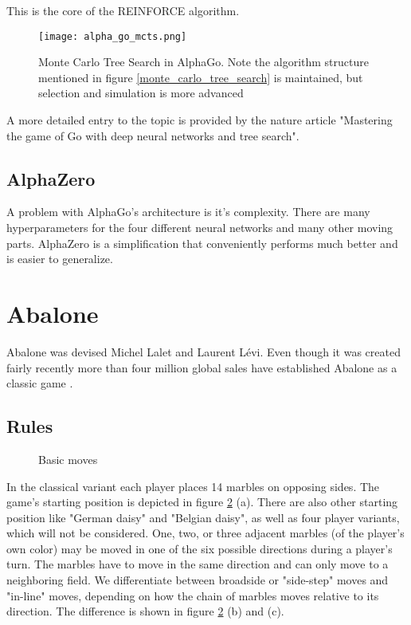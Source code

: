 This is the core of the REINFORCE algorithm. \cite{williams_simple_nodate}
\begin{figure}
    \centering
    \texttt{[image: alpha\_go\_mcts.png]}
    \caption{Monte Carlo Tree Search in AlphaGo. \cite{silver_mastering_2016} Note the algorithm structure mentioned in figure \ref{monte_carlo_tree_search} is maintained, but selection and simulation is more advanced}
    \label{alpha_go_mcts}
\end{figure}

A more detailed entry to the topic is provided by the nature article "Mastering the game of Go with deep neural networks and tree search". \cite{silver_mastering_2016}

\subsection{AlphaZero}
A problem with AlphaGo's architecture is it's complexity. There are many hyperparameters for the four different neural networks and many other moving parts. AlphaZero is a simplification that conveniently performs much better and is easier to generalize.

\section{Abalone}
Abalone was devised Michel Lalet and Laurent Lévi. Even though it was created fairly recently more than four million global sales have established Abalone as a classic game \cite{noauthor_abalone_2020}.

\subsection{Rules}

\begin{figure}[!h]
    \centering
    \hfill
    \hfill
    \caption{Basic moves \cite{abalone_sa_abalone_nodate}}
    \label{basics}
\end{figure}

In the classical variant each player places 14 marbles on opposing sides. The game's starting position is depicted in figure \ref{basics} (a). There are also other starting position like "German daisy" and "Belgian daisy", as well as four player variants, which will not be considered. One, two, or three adjacent marbles (of the player's own color) may be moved in one of the six possible directions during a player's turn. The marbles have to move in the same direction and can only move to a neighboring field. We differentiate between broadside or "side-step" moves and "in-line" moves, depending on how the chain of marbles moves relative to its direction. The difference is shown in figure \ref{basics} (b) and (c).

